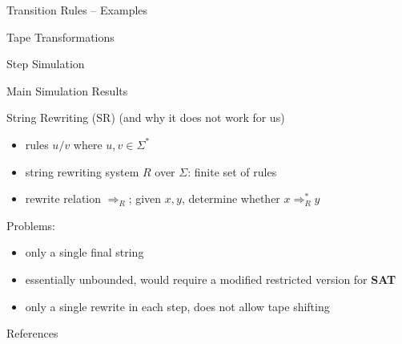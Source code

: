\documentclass[11pt,usenames,dvipsnames,
hyperref={pdfencoding=auto,psdextra}]{beamer}
\newcommand*{\sat}{\textbf{SAT}}
\begin{document}

\begin{frame}{Transition Rules -- Examples}

\end{frame}

\begin{frame}{Tape Transformations}

\end{frame}

\begin{frame}{Step Simulation}
\end{frame}

\begin{frame}{Main Simulation Results}

\end{frame}

\begin{frame}{String Rewriting (SR) (and why it does not work for us)}
  \begin{itemize}
    \item rules $u/v$ where $u, v \in \Sigma^*$
    \item string rewriting system $R$ over $\Sigma$: finite set of rules
    \item rewrite relation $\Rightarrow_R$; given $x, y$, determine whether $x \Rightarrow_R^* y$ 
  \end{itemize}

  Problems: 
  \begin{itemize}
    \item only a single final string 
    \item essentially unbounded, would require a modified restricted version for \sat{}
    \item only a single rewrite in each step, does not allow tape shifting
  \end{itemize}
\end{frame}

\begin{frame}[allowframebreaks]{References}
  \nocite{Sipser:TheoryofComputation}
  \nocite{Bläser:TISkript}
  
  {}
\end{frame}
\end{document}
